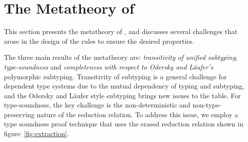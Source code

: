 \section{The Metatheory of \name}
\label{sec:metatheory}

This section presents the metatheory of \name, and discusses several challenges
that arose in the design of the rules to ensure the desired properties.

The three main results of the metatheory are:
\emph{transitivity of unified subtyping}, \emph{type-soundness} and
\emph{completeness with respect to Odersky and L\"aufer's} polymorphic
subtyping. Transitivity of subtyping is a general challenge for dependent type systems due
to the mutual dependency of typing and subtyping, and the Odersky and L\"aufer style
subtyping brings new issues to the table. For type-soundness, the key challenge
is the non-deterministic and non-type-preserving nature of the reduction relation.
To address this issue, we employ a type soundness proof technique
that uses the erased reduction relation shown in figure~\ref{fig:extraction}.


\begin{comment}
In this section, we introduce the design choices of \name to handle to challenge
brought by the dependent generalization of DK's declarative subtyping rules.
We also present the desired properties for \name to hold, which contribute to
the proof of transitivity and type safety.

Transitivity of subtyping is a general challenge for dependent type systems due
to the mutual dependency of typing and subtyping. Thankfully the Unified Subtyping
combines the two so there is only one judgment to reason about. Although
significantly simplified in one aspect, the DK's style subtyping brings new issues
to the table.

Although we have imposed restrictions on the implicit instantiation, they do not
change the indeterministic and non-type-preserving nature of the direct operational
semantics, due to not having access to typing information in the dynamic semantics.
So we choose an indirect path to show the type safety of \name.

And finally, we expect the subtyping relation of \name to subsume the DK's
declarative subtyping.
\end{comment}

